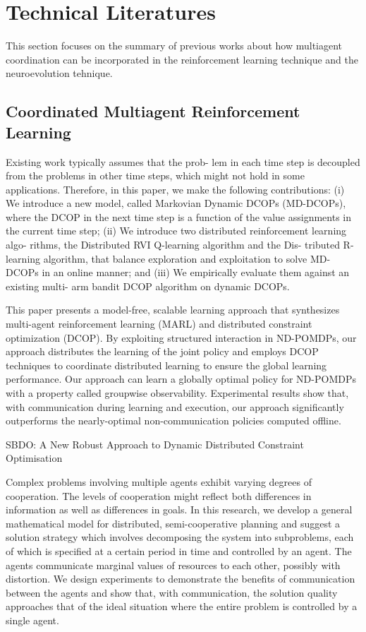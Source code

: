 \documentclass[conference]{IEEEtran}
\begin{document}
\section{Technical Literatures}
This section focuses on the summary of previous works about how multiagent
coordination can be incorporated in the reinforcement learning technique and the
neuroevolution tehnique.
\subsection{Coordinated Multiagent Reinforcement Learning}
\cite{nguyen2014decentralized} Existing work typically assumes that the prob- lem in each time step is decoupled from the problems in other time steps, which might not hold in some applications. Therefore, in this paper, we make the following contributions: (i) We introduce a new model, called Markovian Dynamic DCOPs (MD-DCOPs), where the DCOP in the next time step is a function of the value assignments in the current time step; (ii) We introduce two distributed reinforcement learning algo- rithms, the Distributed RVI Q-learning algorithm and the Dis- tributed R-learning algorithm, that balance exploration and exploitation to solve MD-DCOPs in an online manner; and (iii) We empirically evaluate them against an existing multi- arm bandit DCOP algorithm on dynamic DCOPs.

\cite{zhang2011coordinated} This paper presents a
model-free, scalable learning approach that synthesizes
multi-agent reinforcement learning (MARL) and distributed
constraint optimization (DCOP). By exploiting
structured interaction in ND-POMDPs, our approach
distributes the learning of the joint policy and employs
DCOP techniques to coordinate distributed learning to
ensure the global learning performance. Our approach
can learn a globally optimal policy for ND-POMDPs
with a property called groupwise observability. Experimental
results show that, with communication during
learning and execution, our approach significantly outperforms
the nearly-optimal non-communication policies
computed offline.

SBDO: A New Robust Approach to Dynamic Distributed Constraint Optimisation

\cite{zhang2013coordinating}

\cite{banerjee2012sample}

\cite{kraemer2012informed}

\cite{boukhtouta2011adaptive}
Complex problems involving multiple agents exhibit varying degrees of
cooperation. The levels of cooperation might reflect both differences in
information as well as differences in goals. In this research, we develop a
general mathematical model for distributed, semi-cooperative planning and
suggest a solution strategy which involves decomposing the system into
subproblems, each of which is specified at a certain period in time and
controlled by an agent. The agents communicate marginal values of resources to
each other, possibly with distortion. We design experiments to demonstrate the
benefits of communication between the agents and show that, with
communication, the solution quality approaches that of the ideal situation
where the entire problem is controlled by a single agent.
\end{document}
